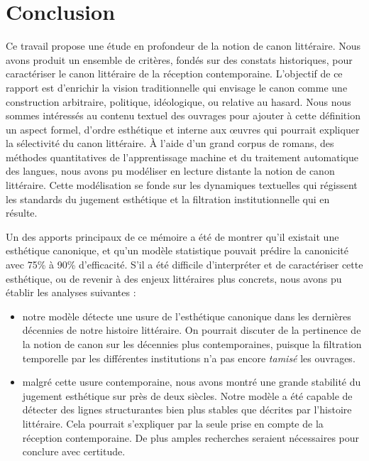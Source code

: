 \part*{Conclusion}

Ce travail propose une étude en profondeur de la notion de canon littéraire. Nous avons produit un ensemble de critères, fondés sur des constats historiques, pour caractériser le canon littéraire de la réception contemporaine. L'objectif de ce rapport est d'enrichir la vision traditionnelle qui envisage le  canon comme une construction arbitraire, politique, idéologique, ou relative au hasard. Nous nous sommes intéressés au contenu textuel des ouvrages pour ajouter à cette définition un aspect formel, d'ordre esthétique et interne aux œuvres qui pourrait expliquer la sélectivité du canon littéraire. À l'aide d'un grand corpus de romans, des méthodes quantitatives de l'apprentissage machine et du traitement automatique des langues, nous avons pu modéliser en lecture distante la notion de canon littéraire. Cette modélisation se fonde sur les dynamiques textuelles qui régissent les standards du jugement esthétique et la filtration institutionnelle qui en résulte.

Un des apports principaux de ce mémoire a été de montrer qu'il existait une esthétique canonique, et qu'un modèle statistique pouvait prédire la canonicité avec 75\% à 90\% d'efficacité. S'il a été difficile d'interpréter et de caractériser cette esthétique, ou de revenir à des enjeux littéraires plus concrets, nous avons pu établir les analyses suivantes : 

\begin{itemize}
    \item notre modèle détecte une usure de l'esthétique canonique dans les dernières décennies de notre histoire littéraire. On pourrait discuter de la pertinence de la notion de canon sur les décennies plus contemporaines, puisque la filtration temporelle par les différentes institutions n'a pas encore \textit{tamisé} les ouvrages.  
    \item malgré cette usure contemporaine, nous avons montré une grande stabilité du jugement esthétique sur près de deux siècles. Notre modèle a été capable de détecter des lignes structurantes bien plus stables que décrites par l'histoire littéraire. Cela pourrait s'expliquer par la seule prise en compte de la réception contemporaine. De plus amples recherches seraient nécessaires pour conclure avec certitude.
\end{itemize}

